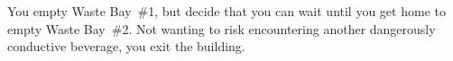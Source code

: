 You empty Waste Bay~\#1,
but decide that you can wait until you get home to empty Waste Bay~\#2.
Not wanting to risk encountering another dangerously conductive beverage,
you exit the building.



